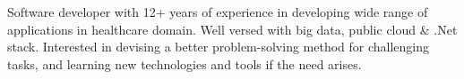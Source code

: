 \par{
Software developer with 12+ years of experience in developing wide range of applications in healthcare domain. Well versed with big data, public cloud \& .Net stack. Interested in devising a better problem-solving method for challenging tasks, and learning new technologies and tools if the need arises.\\
}